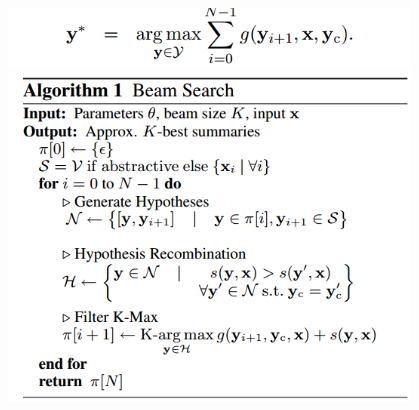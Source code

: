 \documentclass[xcolor={table}]{beamer}
\begin{document}
\begin{frame}{\cite{rush2015neural}}
\begin{figure}[h]
\centering
\begin{columns}
\begin{column}{.48\textwidth}
\includegraphics[scale=.3]{images/dec-rush15} \\
\includegraphics[scale=.3]{images/algo-rush15} \\
\end{column}
\begin{column}{.48\textwidth}

\end{column}
\end{columns}
\end{figure}
\end{frame}
\end{document}
